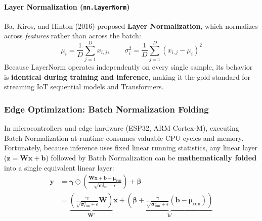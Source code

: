 \paragraph{Layer Normalization (\texttt{nn.LayerNorm})}
Ba, Kiros, and Hinton (2016) proposed \textbf{Layer Normalization}, which normalizes across \textit{features} rather than across the batch:
\begin{equation}
\mu_i = \frac{1}{D}\sum_{j=1}^D x_{i,j}, \qquad \sigma_i^2 = \frac{1}{D}\sum_{j=1}^D (x_{i,j} - \mu_i)^2\label{eq:layernorm}
\end{equation}
Because LayerNorm operates independently on every single sample, its behavior is \textbf{identical during training and inference}, making it the gold standard for streaming IoT sequential models and Transformers.

\subsubsection{Edge Optimization: Batch Normalization Folding}

In microcontrollers and edge hardware (ESP32, ARM Cortex-M), executing Batch Normalization at runtime consumes valuable CPU cycles and memory. Fortunately, because inference uses fixed linear running statistics, any linear layer ($\mathbf{z} = \mathbf{W}\mathbf{x} + \mathbf{b}$) followed by Batch Normalization can be \textbf{mathematically folded} into a single equivalent linear layer:
\begin{align}
\mathbf{y} &= \boldsymbol{\gamma} \odot \left( \frac{\mathbf{W}\mathbf{x} + \mathbf{b} - \boldsymbol{\mu}_{\text{run}}}{\sqrt{\boldsymbol{\sigma}^2_{\text{run}} + \epsilon}} \right) + \boldsymbol{\beta} \nonumber \\
&= \underbrace{\left( \frac{\boldsymbol{\gamma}}{\sqrt{\boldsymbol{\sigma}^2_{\text{run}} + \epsilon}} \mathbf{W} \right)}_{\mathbf{W}'} \mathbf{x} + \underbrace{\left( \boldsymbol{\beta} + \frac{\boldsymbol{\gamma}}{\sqrt{\boldsymbol{\sigma}^2_{\text{run}} + \epsilon}} (\mathbf{b} - \boldsymbol{\mu}_{\text{run}}) \right)}_{\mathbf{b}'}\label{eq:bn_folding}
\end{align}

